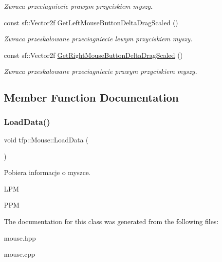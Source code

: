 \begin{DoxyCompactItemize}
\begin{DoxyCompactList}\small\item\em Zwraca przeciagniecie prawym przyciskiem myszy. \end{DoxyCompactList}\item 
\mbox{\label{classtfp_1_1_mouse_af8fabd17deb9f825666262e754e8b9b8}} 
const sf\+::\+Vector2f \mbox{\hyperlink{classtfp_1_1_mouse_af8fabd17deb9f825666262e754e8b9b8}{Get\+Left\+Mouse\+Button\+Delta\+Drag\+Scaled}} ()
\begin{DoxyCompactList}\small\item\em Zwraca przeskalowane przeciagniecie lewym przyciskiem myszy. \end{DoxyCompactList}\item 
\mbox{\label{classtfp_1_1_mouse_a3039a60ae3314a4bf27ebb77b5a70661}} 
const sf\+::\+Vector2f \mbox{\hyperlink{classtfp_1_1_mouse_a3039a60ae3314a4bf27ebb77b5a70661}{Get\+Right\+Mouse\+Button\+Delta\+Drag\+Scaled}} ()
\begin{DoxyCompactList}\small\item\em Zwraca przeskalowane przeciagniecie prawym przyciskiem myszy. \end{DoxyCompactList}\end{DoxyCompactItemize}


\subsection{Member Function Documentation}
\mbox{\label{classtfp_1_1_mouse_a9cad9f88ae445c0bca5eb489216e4160}} 
\subsubsection{\texorpdfstring{Load\+Data()}{LoadData()}}
{\footnotesize\ttfamily void tfp\+::\+Mouse\+::\+Load\+Data (\begin{DoxyParamCaption}{ }\end{DoxyParamCaption})}



Pobiera informacje o myszce. 

L\+PM

P\+PM 

The documentation for this class was generated from the following files\+:\begin{DoxyCompactItemize}
\item 
mouse.\+hpp\item 
mouse.\+cpp\end{DoxyCompactItemize}
